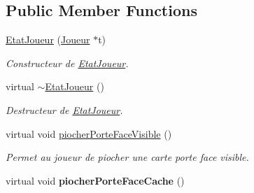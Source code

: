 \subsection*{Public Member Functions}
\begin{DoxyCompactItemize}
\item 
\hyperlink{class_etat_joueur_a1f46122ff2c76ef26731f459ce2d4f45}{Etat\-Joueur} (\hyperlink{class_joueur}{Joueur} $\ast$t)
\begin{DoxyCompactList}\small\item\em Constructeur de \hyperlink{class_etat_joueur}{Etat\-Joueur}. \end{DoxyCompactList}\item 
\hypertarget{class_etat_joueur_acf48f30ed257324bcbac1376df584ea1}{virtual \hyperlink{class_etat_joueur_acf48f30ed257324bcbac1376df584ea1}{$\sim$\-Etat\-Joueur} ()}\label{class_etat_joueur_acf48f30ed257324bcbac1376df584ea1}

\begin{DoxyCompactList}\small\item\em Destructeur de \hyperlink{class_etat_joueur}{Etat\-Joueur}. \end{DoxyCompactList}\item 
virtual void \hyperlink{class_etat_joueur_a43fd1564d3c52d723b42ce58aaf9fb8d}{piocher\-Porte\-Face\-Visible} ()
\begin{DoxyCompactList}\small\item\em Permet au joueur de piocher une carte porte face visible. \end{DoxyCompactList}\item 
\hypertarget{class_etat_joueur_a6e1cd736b5a9ffe254948329bddabf53}{virtual void {\bfseries piocher\-Porte\-Face\-Cache} ()}\label{class_etat_joueur_a6e1cd736b5a9ffe254948329bddabf53}


\end{DoxyCompactItemize}
